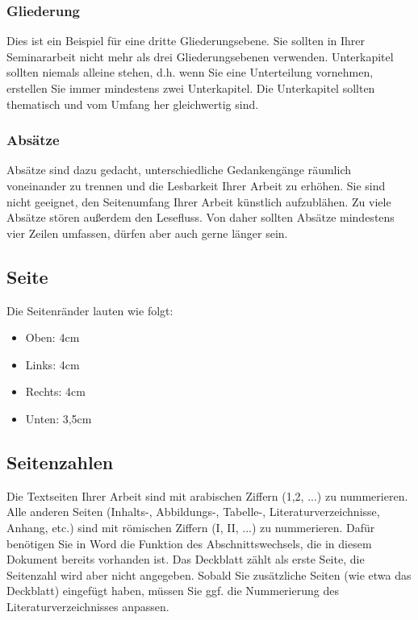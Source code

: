 \documentclass[a4paper,11pt]{article}
\begin{document}
\subsubsection{Gliederung}
Dies ist ein Beispiel für eine dritte Gliederungsebene. Sie sollten in Ihrer Seminararbeit nicht mehr als drei Gliederungsebenen verwenden. Unterkapitel sollten niemals alleine stehen, d.h. wenn Sie eine Unterteilung vornehmen, erstellen Sie immer mindestens zwei Unterkapitel. Die Unterkapitel sollten thematisch und vom Umfang her gleichwertig sind.

\subsubsection{Absätze}
Absätze sind dazu gedacht, unterschiedliche Gedankengänge räumlich voneinander zu trennen und die Lesbarkeit Ihrer Arbeit zu erhöhen. Sie sind nicht geeignet, den Seitenumfang Ihrer Arbeit künstlich aufzublähen. Zu viele Absätze stören außerdem den Lesefluss. Von daher sollten Absätze mindestens vier Zeilen umfassen, dürfen aber auch gerne länger sein. 

\subsection{Seite}
Die Seitenränder lauten wie folgt:
\begin{itemize}
    \item Oben: 4cm
    \item Links: 4cm
    \item Rechts: 4cm
    \item Unten: 3,5cm
\end{itemize}


\subsection{Seitenzahlen}
Die Textseiten Ihrer Arbeit sind mit arabischen Ziffern (1,2, ...) zu nummerieren. Alle anderen Seiten (Inhalts-, Abbildungs-, Tabelle-, Literaturverzeichnisse,  Anhang, etc.) sind mit römischen Ziffern (I, II, ...) zu nummerieren. Dafür benötigen Sie in Word die Funktion des Abschnittswechsels, die in diesem Dokument bereits vorhanden ist. Das Deckblatt zählt als erste Seite, die Seitenzahl wird aber nicht angegeben. Sobald Sie zusätzliche Seiten (wie etwa das Deckblatt) eingefügt haben, müssen Sie ggf. die Nummerierung des Literaturverzeichnisses anpassen. 
\end{document}
